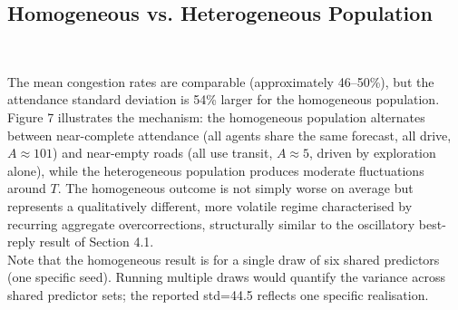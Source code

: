 \subsection{Homogeneous vs. Heterogeneous Population}

\begin{table}[H]
\centering
\small
{} \\
\caption{Homogeneous vs. heterogeneous population dynamics (100 seeds for heterogeneous)}
\end{table}

The mean congestion rates are comparable (approximately 46--50\%), but the attendance standard deviation is 54\% larger for the homogeneous population. Figure 7 illustrates the mechanism: the homogeneous population alternates between near-complete attendance (all agents share the same forecast, all drive, $A \approx 101$) and near-empty roads (all use transit, $A \approx 5$, driven by exploration alone), while the heterogeneous population produces moderate fluctuations around $T$. The homogeneous outcome is not simply worse on average but represents a qualitatively different, more volatile regime characterised by recurring aggregate overcorrections, structurally similar to the oscillatory best-reply result of Section 4.1. \\

Note that the homogeneous result is for a single draw of six shared predictors (one specific seed). Running multiple draws would quantify the variance across shared predictor sets; the reported std=44.5 reflects one specific realisation. \\

